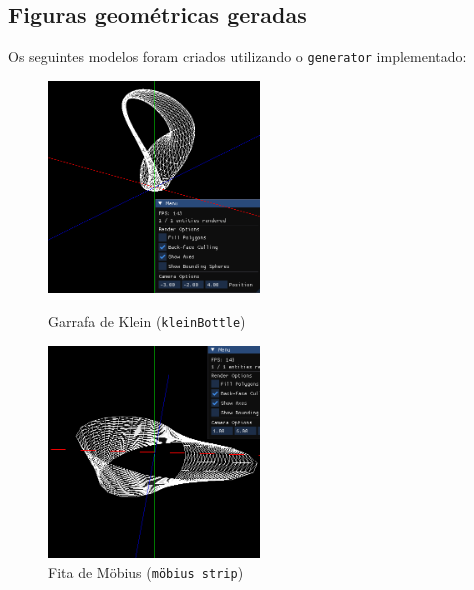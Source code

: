 \documentclass[12pt, a4paper]{article}
\begin{document}
\subsection{Figuras geométricas geradas}

Os seguintes modelos foram criados utilizando o \texttt{generator} implementado:

\begin{figure}[H]
    \centering
    \begin{minipage}{0.48\textwidth}
        \centering
        \includegraphics[width=0.5\textwidth]{res/phase2/results/KleinBottle.png}
        \caption{Garrafa de Klein (\texttt{kleinBottle})}
    \end{minipage}\hfill
    \begin{minipage}{0.48\textwidth}
        \centering
        \includegraphics[width=0.5\textwidth]{res/phase2/results/MobiusStrip.png}
        \caption{Fita de Möbius (\texttt{möbius strip})}
    \end{minipage}
\end{figure}
\end{document}
